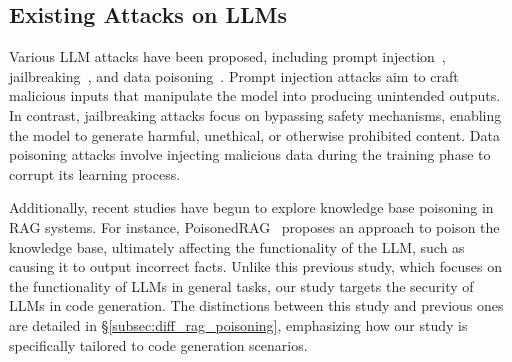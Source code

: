 \subsection{Existing Attacks on LLMs}

Various LLM attacks have been proposed, including prompt injection~\cite{liu2024formalizing,pedro2023prompt,perez2022ignore,liu2023prompt}, jailbreaking~\cite{li2023multi,qi2024visual,deng2024masterkey,zou2023universal,chen2024rmcbench}, and data poisoning~\cite{shafahi2018poison,biggio2012poisoning,carlini2024poisoning}. Prompt injection attacks aim to craft malicious inputs that manipulate the model into producing unintended outputs. In contrast, jailbreaking attacks focus on bypassing safety mechanisms, enabling the model to generate harmful, unethical, or otherwise prohibited content. Data poisoning attacks involve injecting malicious data during the training phase to corrupt its learning process.

Additionally, recent studies have begun to explore knowledge base poisoning in RAG systems. For instance, PoisonedRAG~\cite{zou2024poisonedrag} proposes an approach to poison the knowledge base, ultimately affecting the functionality of the LLM, such as causing it to output incorrect facts. Unlike this previous study, which focuses on the functionality of LLMs in general tasks, our study targets the security of LLMs in code generation.
The distinctions between this study and previous ones are detailed in \S\ref{subsec:diff_rag_poisoning}, emphasizing how our study is specifically tailored to code generation scenarios.

